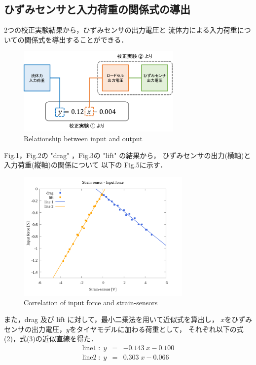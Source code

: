\documentclass[twocolumn,a4j]{jsarticle}
\begin{document}
\subsection{ひずみセンサと入力荷重の関係式の導出}
2つの校正実験結果から，ひずみセンサの出力電圧と
流体力による入力荷重についての関係式を導出することができる．\\
\begin{figure}[htbp]
    \footnotesize
    \begin{center}
        \includegraphics[width=80mm]{../images/image_03.png}
        \caption{Relationship between input and output}
    \end{center}
\end{figure}

Fig.1，Fig.2の "drag" ，Fig.3の "lift" の結果から，
ひずみセンサの出力(横軸)と入力荷重(縦軸)の関係について
以下の Fig.5に示す．\par
\begin{figure}[htbp]
    \footnotesize
    \begin{center}
        \includegraphics[width=85mm]{../images/08_strainsensor-forces&line.png}
        \caption{Correlation of input force and strain-sensors}
    \end{center}
\end{figure}
また，drag 及び lift に対して，最小二乗法を用いて近似式を算出し，
$x$をひずみセンサの出力電圧，$y$をタイヤモデルに加わる荷重として，
それぞれ以下の式(2)，式(3)の近似直線を得た．
\begin{eqnarray}
    \mathrm{line 1} \; : \; y &=& -0.143 \; x - 0.100\\
    \mathrm{line 2} \; : \; y &=& 0.303 \; x - 0.066
\end{eqnarray}
\end{document}
